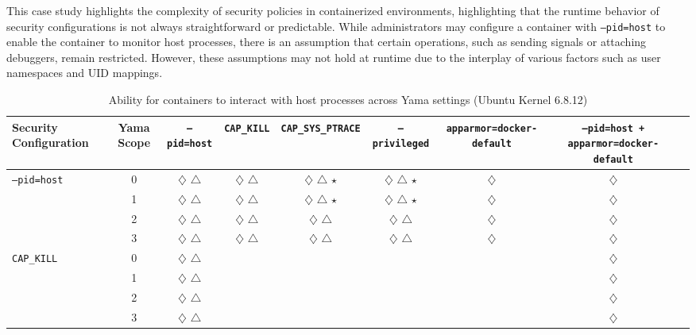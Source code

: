 \begin{doublespace}
This case study highlights the complexity of security policies in containerized environments, highlighting that the runtime behavior of security configurations is not always straightforward or predictable. While administrators may configure a container with \texttt{--pid=host} to enable the container to monitor host processes, there is an assumption that certain operations, such as sending signals or attaching debuggers, remain restricted. However, these assumptions may not hold at runtime due to the interplay of various factors such as user namespaces and UID mappings.


\begin{table}[!h]
    \centering
    \footnotesize
    \setlength{\tabcolsep}{4pt}
    \renewcommand{\arraystretch}{1.1}
    \caption{Ability for containers to interact with host processes across Yama settings (Ubuntu Kernel 6.8.12)}
    \label{tab:combined-pid-namespace-security}
    \begin{adjustbox}{max width=\textwidth}
    \begin{tabular}{|l|c|c|c|c|c|c|c|c|}
        \hline
        \textbf{Security Configuration} & \textbf{Yama Scope} & \texttt{--pid=host} & \texttt{CAP\_KILL} & \texttt{CAP\_SYS\_PTRACE} & \texttt{--privileged} & \texttt{apparmor=docker-default} & \texttt{--pid=host + apparmor=docker-default} \\
        \hline

        \multirow{4}{*}{\texttt{--pid=host}} 
            & 0 & $\diamondsuit$ $\triangle$ & $\diamondsuit$ $\triangle$ & $\diamondsuit$ $\triangle$ $\star$ & $\diamondsuit$ $\triangle$ $\star$ & $\diamondsuit$ & $\diamondsuit$ \\
            & 1 & $\diamondsuit$ $\triangle$ & $\diamondsuit$ $\triangle$ & $\diamondsuit$ $\triangle$ $\star$ & $\diamondsuit$ $\triangle$ $\star$ & $\diamondsuit$ & $\diamondsuit$ \\
            & 2 & $\diamondsuit$ $\triangle$ & $\diamondsuit$ $\triangle$ & $\diamondsuit$ $\triangle$ & $\diamondsuit$ $\triangle$ & $\diamondsuit$ & $\diamondsuit$ \\
            & 3 & $\diamondsuit$ $\triangle$ & $\diamondsuit$ $\triangle$ & $\diamondsuit$ $\triangle$ & $\diamondsuit$ $\triangle$ & $\diamondsuit$ & $\diamondsuit$ \\
        \hline

        \multirow{4}{*}{\texttt{CAP\_KILL}} 
            & 0 & $\diamondsuit$ $\triangle$ &  &  &  &  & $\diamondsuit$ \\
            & 1 & $\diamondsuit$ $\triangle$ &  &  &  &  & $\diamondsuit$ \\
            & 2 & $\diamondsuit$ $\triangle$ &  &  &  &  & $\diamondsuit$ \\
            & 3 & $\diamondsuit$ $\triangle$ &  &  &  &  & $\diamondsuit$ \\
        \hline


\end{tabular}
\end{adjustbox}
\end{table}
\end{doublespace}
